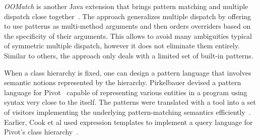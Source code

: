 \emph{OOMatch} is another Java extension that brings pattern matching and multiple 
dispatch close together~\cite{OOMatch07thesis}. The approach generalizes 
multiple dispatch by offering to use patterns as multi-method arguments and then 
orders overriders based on the specificity of their arguments. This allows to 
avoid many ambiguities typical of symmetric multiple dispatch, however it does 
not eliminate them entirely. Similar to others, the approach only deals with a 
limited set of built-in patterns.

When a class hierarchy is fixed, one can design a pattern language that involves 
semantic notions represented by the hierarchy. Pirkelbauer devised a pattern 
language for Pivot~\cite{Pivot09} capable of representing various entities in a 
\Cpp{} program using syntax very close to the \Cpp{} itself. The patterns were 
translated with a tool into a set of visitors implementing the underlying 
pattern-matching semantics efficiently~\cite{PirkelbauerThesis}. Earlier, Cook 
et al used expression templates to implement a query language for Pivot's class 
hierarchy~\cite{iql04}. %
